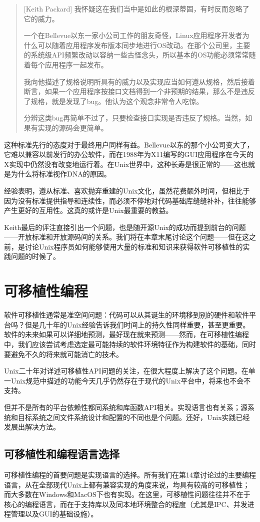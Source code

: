 \documentclass[12pt,oneside]{book}
\begin{document}
\begin{common-format}
\begin{quote}[Keith Packard]
我怀疑这在我们当中是如此的根深蒂固，有时反而忽略了它的威力。

一个在Bellevue以东一家小公司工作的朋友奇怪，Linux应用程序开发者为什么可以随着应用程序发布版本同步地进行OS改动。在那个公司里，主要的系统级API频繁改动以容纳一些古怪念头，所以基本的OS功能必须常常随着每个应用程序一起发布。

我向他描述了规格说明所具有的威力以及实现应当如何遵从规格，然后接着断言，如果一个应用程序按接口文档得到一个非预期的结果，那么不是违反了规格，就是发现了bug。他认为这个观念非常令人吃惊。

分辨这类bug再简单不过了，只要检查接口实现是否违反了规格。当然，如果有实现的源码会更简单。
\end{quote}

这种标准先行的态度对于最终用户同样有益。Bellevue以东的那个小公司变大了，它难以兼容以前发行的办公软件，而在1988年为X11编写的GUI应用程序在今天的X实现中仍然没有改变地运行着。在Unix世界中，这种长寿是很正常的——这也就是为什么将标准视作DNA的原因。

经验表明，遵从标准、喜欢抛弃重建的Unix文化，虽然花费额外时间，但相比于因为没有标准提供指导和连续性，而必须不停地对代码基础库缝缝补补，往往能够产生更好的互用性。这真的或许是Unix最重要的教益。

Keith最后的评注直接引出一个问题，也是随开源Unix的成功而提到前台的问题——开放标准和开放源码间的关系。我们将在本章末尾讨论这个问题——但在这之前，是讨论Unix程序员如何能够使用大量的标准和知识来获得软件可移植性的实践问题的时候了。

\section{可移植性编程}
软件可移植性通常是准空间问题：代码可以从其诞生的环境移到别的硬件和软件平台吗？但是几十年的Unix经验告诉我们时间上的持久性同样重要，甚至更重要。软件的未来如果可以详细地预测，最好现在就来预测——然而，在可移植性编程中，我们应该尝试考虑选定最可能持续的软件环境特征作为构建软件的基础，同时要避免不久的将来就可能消亡的技术。

Unix二十年对详述可移植性API问题的关注，在很大程度上解决了这个问题。在单一Unix规范中描述的功能今天几乎仍然存在于现代的Unix平台中，将来也不会不支持。

但并不是所有的平台依赖性都同系统和库函数API相关。实现语言也有关系；源系统和目标系统之间文件系统设计和配置的不同也是个问题。还好，Unix实践已经发展出解决方法。

\subsection{可移植性和编程语言选择}
可移植性编程的首要问题是实现语言的选择。所有我们在第14章讨论过的主要编程语言，从在全部现代Unix上都有兼容实现的角度来说，均具有较高的可移植性；而大多数在Windows和MacOS下也有实现。在这里，可移植性问题往往并不在于核心的编程语言，而在于支持库以及同本地环境整合的程度（尤其是IPC、并发进程管理以及GUI的基础设施）。


\end{common-format}
\end{document}
